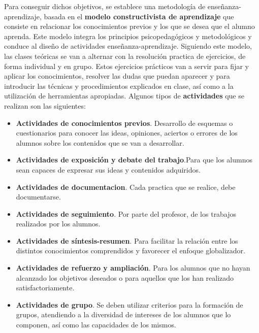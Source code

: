 \documentclass[spanish,12pt, a4paper,twoside]{paper}
\begin{document}
\justify
Para conseguir dichos objetivos, se establece una metodología de enseñanza-aprendizaje, basada en el \textbf{modelo constructivista de aprendizaje} que consiste en relacionar los conocimientos previos y los que se desea que el alumno aprenda. Este modelo integra los principios psicopedagógicos y metodológicos y conduce al diseño de actividades enseñanza-aprendizaje.
\justify
Siguiendo este modelo, las clases teóricas se van a alternar con la resolución practica de ejercicios, de forma individual y en grupo. Estos ejercicios prácticos van a servir para fijar y aplicar los conocimientos, resolver las dudas que puedan aparecer y para introducir las técnicas y procedimientos explicados en clase, así como a la utilización de herramientas apropiadas. %
\justify
Algunos tipos de \textbf{actividades} que se realizan son las siguientes:
\begin{itemize}
\item \textbf{Actividades de conocimientos previos}. Desarrollo de esquemas o cuestionarios para conocer las ideas, opiniones, aciertos o errores de los alumnos sobre los contenidos que se van a desarrollar.
\item \textbf{Actividades de exposición y debate del trabajo}.Para que los alumnos sean capaces de expresar sus ideas y contenidos adquiridos.
\item \textbf{Actividades de documentacion}. Cada practica que se realice, debe documentarse.
\item \textbf{Actividades de seguimiento}. Por parte del profesor, de los trabajos realizados por los alumnos.
\item \textbf{Actividades de síntesis-resumen}. Para facilitar la relación entre los distintos conocimientos comprendidos y favorecer el enfoque globalizador.
\item \textbf{Actividades de refuerzo y ampliación}. Para los alumnos que no hayan alcanzado los objetivos deseados o para aquellos que los han realizado satisfactoriamente.
\item \textbf{Actividades de grupo}. Se deben utilizar criterios para la formación de grupos, atendiendo a la diversidad de intereses de los alumnos que lo componen, así como las capacidades de los mismos.
\end{itemize}

\end{document}
